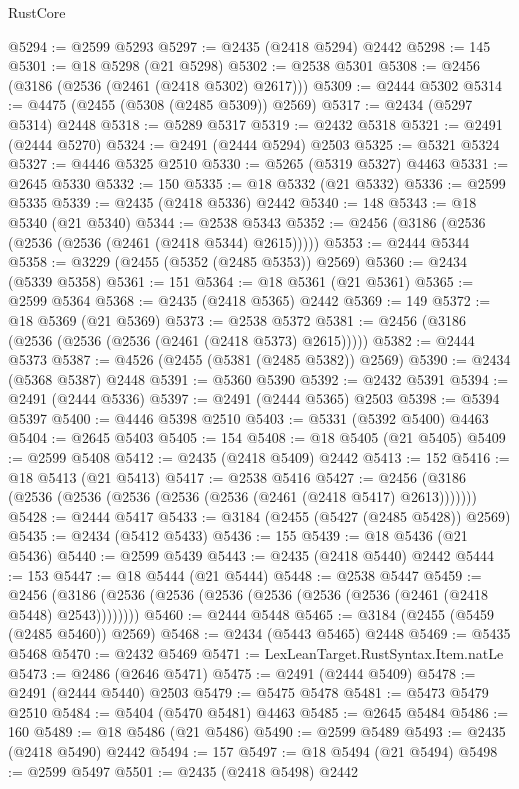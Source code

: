 \begin{lexlean}{RustCore}
\begin{coremodule}
@5294 := @2599 @5293
@5297 := @2435 (@2418 @5294) @2442
@5298 := 145
@5301 := @18 @5298 (@21 @5298)
@5302 := @2538 @5301
@5308 := @2456 (@3186 (@2536 (@2461 (@2418 @5302) @2617)))
@5309 := @2444 @5302
@5314 := @4475 (@2455 (@5308 (@2485 @5309)) @2569)
@5317 := @2434 (@5297 @5314) @2448
@5318 := @5289 @5317
@5319 := @2432 @5318
@5321 := @2491 (@2444 @5270)
@5324 := @2491 (@2444 @5294) @2503
@5325 := @5321 @5324
@5327 := @4446 @5325 @2510
@5330 := @5265 (@5319 @5327) @4463
@5331 := @2645 @5330
@5332 := 150
@5335 := @18 @5332 (@21 @5332)
@5336 := @2599 @5335
@5339 := @2435 (@2418 @5336) @2442
@5340 := 148
@5343 := @18 @5340 (@21 @5340)
@5344 := @2538 @5343
@5352 := @2456 (@3186 (@2536 (@2536 (@2536 (@2461 (@2418 @5344) @2615)))))
@5353 := @2444 @5344
@5358 := @3229 (@2455 (@5352 (@2485 @5353)) @2569)
@5360 := @2434 (@5339 @5358)
@5361 := 151
@5364 := @18 @5361 (@21 @5361)
@5365 := @2599 @5364
@5368 := @2435 (@2418 @5365) @2442
@5369 := 149
@5372 := @18 @5369 (@21 @5369)
@5373 := @2538 @5372
@5381 := @2456 (@3186 (@2536 (@2536 (@2536 (@2461 (@2418 @5373) @2615)))))
@5382 := @2444 @5373
@5387 := @4526 (@2455 (@5381 (@2485 @5382)) @2569)
@5390 := @2434 (@5368 @5387) @2448
@5391 := @5360 @5390
@5392 := @2432 @5391
@5394 := @2491 (@2444 @5336)
@5397 := @2491 (@2444 @5365) @2503
@5398 := @5394 @5397
@5400 := @4446 @5398 @2510
@5403 := @5331 (@5392 @5400) @4463
@5404 := @2645 @5403
@5405 := 154
@5408 := @18 @5405 (@21 @5405)
@5409 := @2599 @5408
@5412 := @2435 (@2418 @5409) @2442
@5413 := 152
@5416 := @18 @5413 (@21 @5413)
@5417 := @2538 @5416
@5427 := @2456 (@3186 (@2536 (@2536 (@2536 (@2536 (@2536 (@2461 (@2418 @5417) @2613)))))))
@5428 := @2444 @5417
@5433 := @3184 (@2455 (@5427 (@2485 @5428)) @2569)
@5435 := @2434 (@5412 @5433)
@5436 := 155
@5439 := @18 @5436 (@21 @5436)
@5440 := @2599 @5439
@5443 := @2435 (@2418 @5440) @2442
@5444 := 153
@5447 := @18 @5444 (@21 @5444)
@5448 := @2538 @5447
@5459 := @2456 (@3186 (@2536 (@2536 (@2536 (@2536 (@2536 (@2536 (@2461 (@2418 @5448) @2543))))))))
@5460 := @2444 @5448
@5465 := @3184 (@2455 (@5459 (@2485 @5460)) @2569)
@5468 := @2434 (@5443 @5465) @2448
@5469 := @5435 @5468
@5470 := @2432 @5469
@5471 := LexLeanTarget.RustSyntax.Item.natLe
@5473 := @2486 (@2646 @5471)
@5475 := @2491 (@2444 @5409)
@5478 := @2491 (@2444 @5440) @2503
@5479 := @5475 @5478
@5481 := @5473 @5479 @2510
@5484 := @5404 (@5470 @5481) @4463
@5485 := @2645 @5484
@5486 := 160
@5489 := @18 @5486 (@21 @5486)
@5490 := @2599 @5489
@5493 := @2435 (@2418 @5490) @2442
@5494 := 157
@5497 := @18 @5494 (@21 @5494)
@5498 := @2599 @5497
@5501 := @2435 (@2418 @5498) @2442

\end{coremodule}
\end{lexlean}
